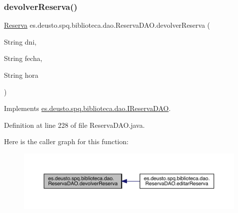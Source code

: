 \subsubsection{\texorpdfstring{devolver\+Reserva()}{devolverReserva()}}
{\footnotesize\ttfamily \mbox{\hyperlink{classes_1_1deusto_1_1spq_1_1biblioteca_1_1data_1_1_reserva}{Reserva}} es.\+deusto.\+spq.\+biblioteca.\+dao.\+Reserva\+D\+A\+O.\+devolver\+Reserva (\begin{DoxyParamCaption}\item[{String}]{dni,  }\item[{String}]{fecha,  }\item[{String}]{hora }\end{DoxyParamCaption})}



Implements \mbox{\hyperlink{interfacees_1_1deusto_1_1spq_1_1biblioteca_1_1dao_1_1_i_reserva_d_a_o_a5cd7d25bee6f31574e42d290a42cf856}{es.\+deusto.\+spq.\+biblioteca.\+dao.\+I\+Reserva\+D\+AO}}.



Definition at line 228 of file Reserva\+D\+A\+O.\+java.

Here is the caller graph for this function\+:
\nopagebreak
\begin{figure}[H]
\begin{center}
\leavevmode
\includegraphics[width=350pt]{classes_1_1deusto_1_1spq_1_1biblioteca_1_1dao_1_1_reserva_d_a_o_a84d61d9c1fbd0a2c7a17107354b6169e_icgraph}
\end{center}
\end{figure}
\mbox{\label{classes_1_1deusto_1_1spq_1_1biblioteca_1_1dao_1_1_reserva_d_a_o_a88e9785413691dee23241ef307b4e93d}} 
